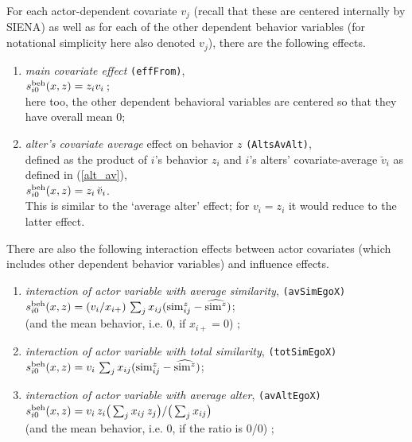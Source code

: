 \documentclass[a4paper,fleqn,11pt]{article}
\newcommand{\+}{\, + \,}
\newcommand{\vit}{\theenumi}
\newcommand{\si}{{\sf SIENA}}
\newcounter{savenumi}
\begin{document}
\noindent
For each actor-dependent covariate $v_j$ (recall that these are
centered internally by \si) as well as for each of the other
dependent behavior variables (for notational simplicity here also
denoted $v_j$), there are the following effects.
\begin{enumerate}
\setcounter{enumi}{\value{savenumi}}
 \item {\em main covariate effect} \texttt{(effFrom)},\\
 $s^{\rm beh}_{i\vit}(x, z) = z_{i} v_{i}\,$;\\
 here too, the other dependent behavioral variables are centered so that they
 have overall mean 0;
\item \emph{alter's covariate average } effect on behavior $z$
 \texttt{(AltsAvAlt)},\\
      defined as the product of $i$'s behavior $z_i$ and
      $i$'s alters' covariate-average $\breve v_i$ as defined
      in (\ref{alt_av}),\\
       $s^{\rm beh}_{i\vit}(x, z) = z_i \, \breve v_i $.\\
      This is similar to the `average alter' effect; for
      $v_i = z_i$ it would reduce to the latter effect.
\setcounter{savenumi}{\value{enumi}}
\end{enumerate}
There are also the following interaction effects between actor covariates
(which includes other dependent behavior variables)
and influence effects.
\begin{enumerate}
\setcounter{enumi}{\value{savenumi}}
\item {\em interaction of actor variable with average similarity},
                       \texttt{(avSimEgoX)} \\
 $s^{\rm beh}_{i\vit}(x, z) = (v_i / x_{i+}) \,
         \sum_j x_{ij} ({\rm sim}^z_{ij} - \widehat{{\rm sim}^z}) $;\\
 (and the mean behavior, i.e. $0$, if $x_{i+} = 0$) ;
\item {\em interaction of actor variable with total similarity},
                       \texttt{(totSimEgoX)} \\
 $s^{\rm beh}_{i\vit}(x, z) = v_i \,
         \sum_j x_{ij} ({\rm sim}^z_{ij} - \widehat{{\rm sim}^z}) $;
\item {\em interaction of actor variable with average alter},
                       \texttt{(avAltEgoX)} \\
 $s^{\rm beh}_{i\vit}(x, z) =  v_i \, z_i \big( \sum_j x_{ij}\, z_j \big)
                                / \big (\sum_j x_{ij}\big)  $\\
 (and the mean behavior, i.e. $0$, if the ratio is 0/0) ;
\setcounter{savenumi}{\value{enumi}}
\end{enumerate}
\end{document}

